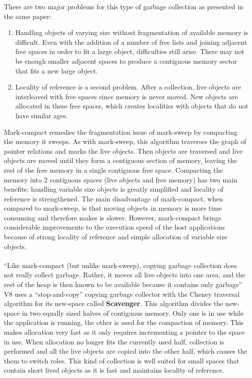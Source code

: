 \documentclass{l4proj}
\begin{document}
There are two major problems for this type of garbage collection as presented in the same paper:
\begin{enumerate}
\item Handling objects of varying size without fragmentation of available memory is difficult. Even with the addition of a number of free lists and joining adjacent free spaces in order to fit a large object, difficulties still arise. There may not be enough smaller adjacent spaces to produce a contiguous memory sector that fits a new large object. 
\item Locality of reference is a second problem. After a collection, live objects are interleaved with free spaces since memory is never moved. New objects are allocated in these free spaces, which creates localities with objects that do not have similar ages.%
\end{enumerate}
\hspace*{1em} Mark-compact remedies the fragmentation issue of mark-sweep by compacting the memory it sweeps. As with mark-sweep, this algorithm traverses the graph of pointer relations and marks the live objects. Then objects are traversed and live objects are moved until they form a contiguous section of memory, leaving the rest of the free memory in a single contiguous free space. Compacting the memory into 2 contiguous spaces (live objects and free memory) has two main benefits: handling variable size objects is greatly simplified and locality of reference is strengthened. The main disadvantage of mark-compact, when compared to mark-sweep, is that moving objects in memory is more time consuming and therefore makes is slower. However, mark-compact brings considerable improvements to the execution speed of the host applications because of strong locality of reference and simple allocation of variable size objects\cite{gcpaper}.%
\\\\
\hspace*{1em} ``Like mark-compact (but unlike mark-sweep), copying garbage collection does not really collect garbage. Rather, it moves all live objects into one area, and the rest of the heap is then known to be available because it contains only garbage'' \cite{gcpaper} V8 uses a ``stop-and-copy'' copying garbage collector with the Cheney traversal algorithm for its new-space called \textbf{Scavenger}. This algorithm divides the new-space in two equally sized halves of contiguous memory. Only one is in use while the application is running, the other is used for the compaction of memory. This makes allocation very fast as it only requires incrementing a pointer to the space in use. When allocation no longer fits the currently used half, collection is performed and all the live objects are copied into the other half, which causes the them to switch roles\cite{gcpaper}. This kind of collection is well suited for small spaces that contain short lived objects as it is fast and maintains locality of reference.
\end{document}
